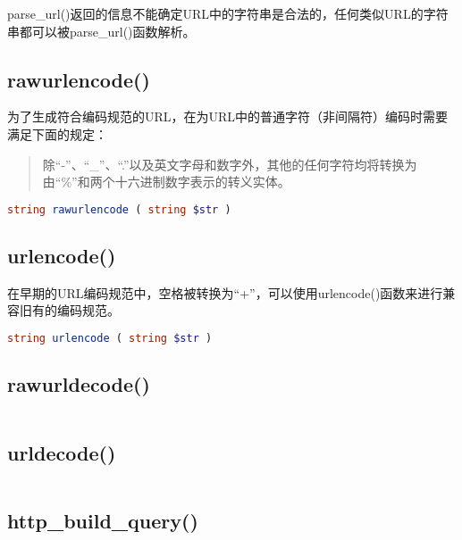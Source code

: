 parse\_url()返回的信息不能确定URL中的字符串是合法的，任何类似URL的字符串都可以被parse\_url()函数解析。

\subsection{rawurlencode()}

为了生成符合编码规范的URL，在为URL中的普通字符（非间隔符）编码时需要满足下面的规定：

\begin{quote}
除“-”、“\_”、“.”以及英文字母和数字外，其他的任何字符均将转换为由“\%”和两个十六进制数字表示的转义实体。
\end{quote}




\begin{lstlisting}[language=PHP]
string rawurlencode ( string $str )
\end{lstlisting}

\subsection{urlencode()}


在早期的URL编码规范中，空格被转换为“+”，可以使用urlencode()函数来进行兼容旧有的编码规范。


\begin{lstlisting}[language=PHP]
string urlencode ( string $str )
\end{lstlisting}

\subsection{rawurldecode()}



\begin{lstlisting}[language=PHP]

\end{lstlisting}



\subsection{urldecode()}



\begin{lstlisting}[language=PHP]

\end{lstlisting}

\subsection{http\_build\_query()}

